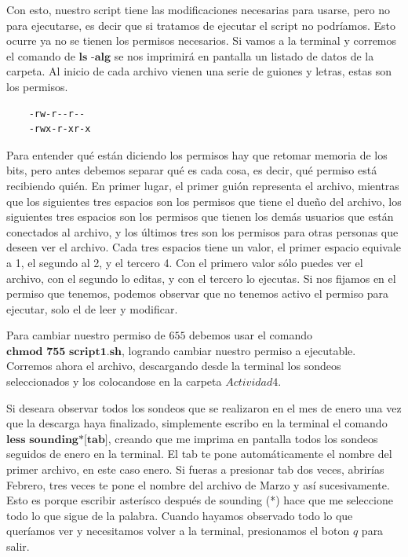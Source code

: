 \documentclass{article}
\begin{document}
Con esto, nuestro script tiene las modificaciones necesarias para usarse, pero no para ejecutarse, es decir que si tratamos de ejecutar el script no podríamos. Esto ocurre ya no se tienen los permisos necesarios. Si vamos a la terminal y corremos el comando de $\textbf{ls -alg}$ se nos imprimirá en pantalla un listado de datos de la carpeta. Al inicio de cada archivo vienen una serie de guiones y letras, estas son los permisos.

	\begin{verbatim}
    -rw-r--r--
    -rwx-r-xr-x
    \end{verbatim}
    
Para entender qué están diciendo los permisos hay que retomar memoria de los bits, pero antes debemos separar qué es cada cosa, es decir, qué permiso está recibiendo quién. En primer lugar, el primer guión representa el archivo, mientras que los siguientes tres espacios son los permisos que tiene el dueño del archivo, los siguientes tres espacios son los permisos que tienen los demás usuarios que están conectados al archivo, y los últimos tres son los permisos para otras personas que deseen ver el archivo. Cada tres espacios tiene un valor, el primer espacio equivale a 1, el segundo al 2, y el tercero 4. Con el primero valor sólo puedes ver el archivo, con el segundo lo editas, y con el tercero lo ejecutas. Si nos fijamos en el permiso que tenemos, podemos observar que no tenemos activo el permiso para ejecutar, solo el de leer y modificar. 

Para cambiar nuestro permiso de $655$ debemos usar el comando $\textbf{chmod 755 script1.sh}$, logrando cambiar nuestro permiso a ejecutable. Corremos ahora el archivo, descargando desde la terminal los sondeos seleccionados y los colocandose en la carpeta $Actividad4$.
    
Si deseara observar todos los sondeos que se realizaron en el mes de enero una vez que la descarga haya finalizado, simplemente escribo en la terminal el comando $\textbf{less sounding*[tab]}$, creando que me imprima en pantalla todos los sondeos seguidos de enero en la terminal. El tab te pone automáticamente el nombre del primer archivo, en este caso enero. Si fueras a presionar tab dos veces, abrirías Febrero, tres veces te pone el nombre del archivo de Marzo y así sucesivamente. Esto es porque escribir asterísco después de sounding (*) hace que me seleccione todo lo que sigue de la palabra. Cuando hayamos observado todo lo que queríamos ver y necesitamos volver a la terminal, presionamos el boton $q$ para salir.
\end{document}
